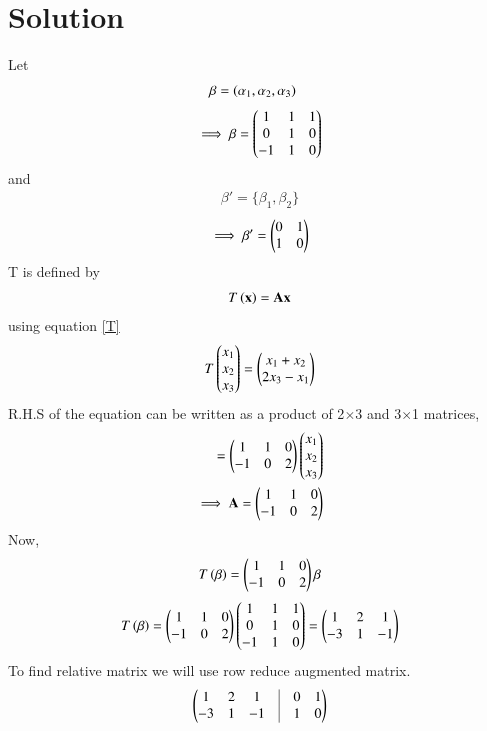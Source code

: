 \documentclass[journal,12pt,twocolumn]{IEEEtran}
\begin{document}
\section{\textbf{Solution}}
Let
\begin{align}
\beta &= \left(\alpha_1,\alpha_2,\alpha_3\right)
\end{align}
\begin{align}
\implies \beta=\begin{pmatrix}1&1&1\\0&1&0\\-1&1&0\end{pmatrix}
\end{align}
and
\begin{align}
\beta' = \{\beta_1 , \beta_2\}
\end{align}
\begin{align}
\implies \beta'=\begin{pmatrix}0&1\\1&0\end{pmatrix}
\end{align}
T is defined by
\begin{align}
   T\left(\mathbf{x}\right) = \mathbf{A}\mathbf{x}
 \end{align}
using equation \eqref{T}
\begin{align}
T\begin{pmatrix}x_1\\x_2\\x_3\end{pmatrix}=\begin{pmatrix}x_1+x_2\\2x_3-x_1\end{pmatrix}
\end{align}
R.H.S of the equation can be written as a product of 2$\times$3 and 3$\times$1 matrices,
\begin{align}
=\begin{pmatrix}1&1&0\\-1&0&2\end{pmatrix}\begin{pmatrix}x_1\\x_2\\x_3\end{pmatrix}\\
\implies \mathbf{A}=\begin{pmatrix}1&1&0\\-1&0&2\end{pmatrix}
\end{align}
Now,
 \begin{align}
    T\left(\beta\right)=\begin{pmatrix}1&1&0\\-1&0&2\end{pmatrix}{\beta}
\end{align}
\begin{align}
    T\left(\beta\right)=\begin{pmatrix}1&1&0\\-1&0&2\end{pmatrix}\begin{pmatrix}1&1&1\\0&1&0\\-1&1&0\end{pmatrix}
    =\begin{pmatrix}1&2&1\\-3&1&-1\end{pmatrix}
\end{align}
To find relative matrix we will use row reduce augmented matrix.
\begin{align}
    \myvec{1&2&1&\vline&0&1\\-3&1&-1&\vline&1&0}
\end{align}
\end{document}

